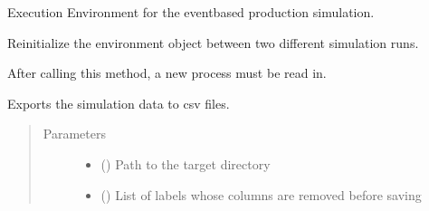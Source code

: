 \documentclass[letterpaper,10pt,english]{sphinxmanual}
\begin{document}
\begin{fulllineitems}
\label{\detokenize{source/API/api:environment.Environment}}
\sphinxAtStartPar
Execution Environment for the event\sphinxhyphen{}based production simulation.

\begin{fulllineitems}
\label{\detokenize{source/API/api:environment.Environment.clear_env}}
\sphinxAtStartPar
Reinitialize the environment object between two different simulation runs.

\sphinxAtStartPar
After calling this method, a new process must be read in.

\end{fulllineitems}


\begin{fulllineitems}
\label{\detokenize{source/API/api:environment.Environment.data_to_csv}}
\sphinxAtStartPar
Exports the simulation data to csv files.
\begin{quote}\begin{description}
\item[{Parameters}] \leavevmode\begin{itemize}
\item {} 
\sphinxAtStartPar
{} () \textendash{} Path to the target directory

\item {} 
\sphinxAtStartPar
{} (\sphinxstyleliteralemphasis{\sphinxupquote{{[}}}\sphinxstyleliteralemphasis{\sphinxupquote{{]}}}\sphinxstyleliteralemphasis{\sphinxupquote{, }}) \textendash{} List of labels whose columns are removed before saving


\end{itemize}
\end{description}
\end{quote}
\end{fulllineitems}
\end{fulllineitems}
\end{document}
